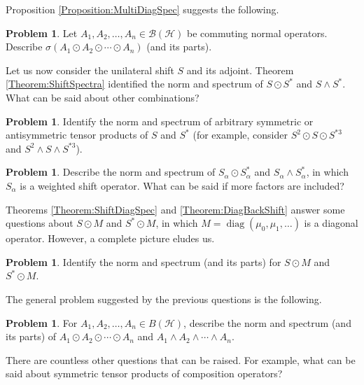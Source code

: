 \documentclass[10pt,reqno]{amsart}
\newcommand{\0}{{\color{lightgray}0}}
\newcommand{\B}{\mathcal{B}}
\newcommand{\diag}{\operatorname{diag}}
\newcommand{\h}{\mathcal{H}}
\theoremstyle{definition}
\newcounter{problem}
\newtheorem{Problem}[problem]{Problem}
\numberwithin{equation}{section}
\begin{document}
Proposition \ref{Proposition:MultiDiagSpec} suggests the following.

\begin{Problem}
Let $A_1, A_2, \ldots, A_n \in \B(\h)$ be commuting normal operators.
Describe $\sigma(A_1 \odot A_2 \odot \cdots \odot A_n)$ (and its parts).
\end{Problem}






Let us now consider the unilateral shift $S$ and its adjoint.
Theorem \ref{Theorem:ShiftSpectra} identified the norm and spectrum of $S \odot S^*$
and $S \wedge S^*$.  What can be said about other combinations?

\begin{Problem}
Identify the norm and spectrum of arbitrary symmetric or antisymmetric
tensor products of $S$ and $S^*$ (for example, consider $S^2 \odot S \odot S^{*3}$ and $S^2 \wedge S \wedge S^{*3}$).
\end{Problem}

\begin{Problem}
Describe the norm and spectrum of $S_{\alpha} \odot S_{\alpha}^*$ and $S_{\alpha} \wedge S_{\alpha}^*$, 
in which $S_{\alpha}$ is a weighted shift operator.  What can be said if more factors are included?
\end{Problem}



Theorems \ref{Theorem:ShiftDiagSpec} and \ref{Theorem:DiagBackShift} answer some questions
about $S \odot M$ and $S^* \odot M$, in which $M=\diag(\mu_0,\mu_1,\ldots)$ is a diagonal operator.
However, a complete picture eludes us.

\begin{Problem}
Identify the norm and spectrum (and its parts) for $S \odot M$ and $S^* \odot M$.
\end{Problem}

The general problem suggested by the previous questions is the following.

\begin{Problem}
For $A_1,A_2,\ldots,A_n \in B(\h)$, describe the norm and spectrum (and its parts)  of
$A_1 \odot A_2 \odot \cdots \odot A_n$ and $A_1 \wedge A_2 \wedge \cdots \wedge A_n$.
\end{Problem}

There are countless other questions that can be raised.
For example, what can be said about symmetric tensor products of composition operators?




\end{document}
